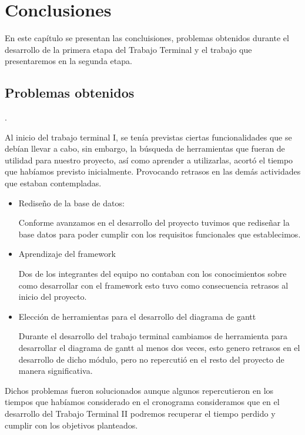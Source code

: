 \chapter{Conclusiones}	
\label{cap:reqSist}

	En este capítulo se presentan las concluisiones, problemas obtenidos durante el desarrollo de la primera etapa del Trabajo Terminal y el trabajo que presentaremos en la segunda etapa.

\section{Problemas obtenidos }. 

Al inicio del trabajo terminal I, se tenía previstas ciertas funcionalidades que se debían llevar a cabo, sin embargo, la búsqueda de herramientas que fueran de utilidad para nuestro proyecto, así como aprender a utilizarlas, acortó el tiempo que habíamos previsto inicialmente. Provocando retrasos en las demás actividades que estaban contempladas. 

\begin{itemize}
\item 
Rediseño de la base de datos:  

Conforme avanzamos en el desarrollo del proyecto tuvimos que rediseñar la base datos para poder cumplir con los requisitos funcionales que establecimos. 
\item 
Aprendizaje del framework  

Dos de los integrantes del equipo no contaban con los conocimientos sobre como desarrollar con el framework esto tuvo como consecuencia retrasos al inicio del proyecto. 
\item 
Elección de herramientas para el desarrollo del diagrama de gantt 

 Durante el desarrollo del trabajo terminal cambiamos de herramienta para desarrollar el diagrama de gantt al menos dos veces, esto genero retrasos en el desarrollo de dicho módulo, pero no repercutió en el resto del proyecto de manera significativa.  

\end{itemize}

Dichos problemas fueron solucionados aunque algunos repercutieron en los tiempos que habíamos considerado en el cronograma consideramos que en el desarrollo del Trabajo Terminal II podremos recuperar el tiempo perdido y cumplir con los objetivos planteados.  


